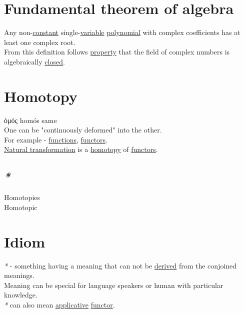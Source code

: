 \documentclass[a4paper,14pt,oneside]{book}
\begin{document}
\chapter{\label{org32205d6}Fundamental theorem of algebra}
\label{sec:orgc15253f}
Any non-\hyperref[orga5fcec4]{constant} single-\hyperref[org029d8fd]{variable} \hyperref[org89e4755]{polynomial} with complex coefficients has at least one complex root.\\

From this definition follows \hyperref[org91a1c9f]{property} that the field of complex numbers is algebraically \hyperref[orgcda5e16]{closed}.\\

\chapter{\label{org9b933b5}Homotopy}
\label{sec:org5e112dd}
ὁμός homós same\\

One can be "continuously deformed" into the other.\\

For example - \hyperref[org0bd6046]{functions}, \hyperref[orgcde2498]{functors}.\\
\hyperref[orgb7c300c]{Natural transformation} is a \hyperref[org9b933b5]{homotopy} of \hyperref[orgcde2498]{functors}.\\

\section{\emph{*}}
\label{sec:orga7d5f44}

\label{org8ec02f5}Homotopies\\
\label{org51a7d61}Homotopic\\

\chapter{\label{org249bbc7}Idiom}
\label{sec:org14ad9af}
\emph{*} - something having a meaning that can not be \hyperref[org96dd25f]{derived} from the conjoined meanings.\\
Meaning can be special for language speakers or human with particular knowledge.\\

\emph{*} can also mean \hyperref[org7918dd8]{applicative} \hyperref[orge5e236e]{functor}.\\
\end{document}
